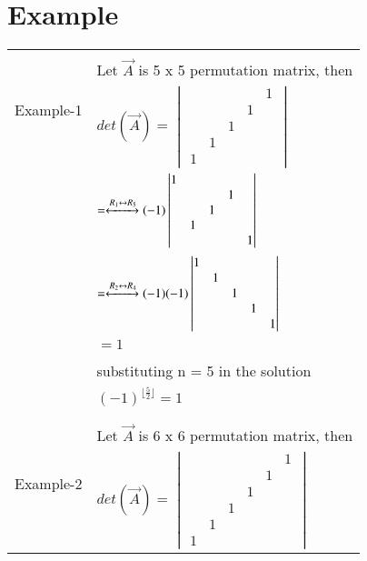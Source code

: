 \documentclass[journal,12pt]{IEEEtran}
\begin{document}
\section{\textbf{Example}}
\renewcommand{\thetable}{2}
\begin{longtable}{|l|l|}
\hline
\multirow{3}{*}{Example-1} & \\
& Let $\vec{A}$ is 5 x 5 permutation matrix, then\\
& $det(\vec{A})= \begin{vmatrix} & & & &1\\ & & &1& \\ & &1& & \\ &1& & & \\1& & & &    \end{vmatrix}$\\
& $ = \xleftrightarrow[]{R_1 \leftrightarrow R_5}
(-1)\begin{vmatrix}
1& & & & \\ & & &1& \\ & &1& & \\ &1& & & \\ & & & &1 
\end{vmatrix}$\\
& $ = \xleftrightarrow[]{R_2 \leftrightarrow R_4}
(-1)(-1)\begin{vmatrix}
1& & & & \\ &1& & & \\ & &1& & \\ & & &1& \\ & & & &1 
\end{vmatrix}$\\
& $ = 1$\\
& \\
& substituting n = 5 in the solution\\
& $(-1)^{\lfloor \frac{5}{2} \rfloor} = 1$\\
& \\
\hline
\multirow{3}{*}{Example-2} & \\
& Let $\vec{A}$ is 6 x 6 permutation matrix, then    \\
& $det(\vec{A})= \begin{vmatrix} & & & & &1\\ & & & &1& \\ & & &1& & \\ & &1& & & \\ &1& & & & \\1& & & & &    \end{vmatrix}$\\

\end{longtable}
\end{document}
